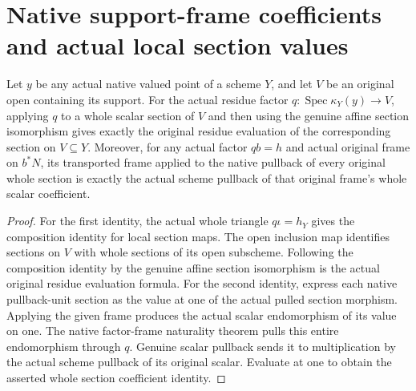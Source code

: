 \section{Native support-frame coefficients and actual local section values}

\begin{lemma}\label{lem:fc-support-factor-scalar-residue}
\leanok
{}
Let $y$ be any actual native valued point of a scheme $Y$, and
let $V$ be an original open containing its support. For the actual
residue factor $q:\operatorname{Spec}\kappa_Y(y)\to V$, applying
$q$ to a whole scalar section of $V$ and then using the genuine
affine section isomorphism gives exactly the original residue
evaluation of the corresponding section on $V\subseteq Y$.
Moreover, for any actual factor $q b=h$ and actual original frame
on $b^*N$, its transported frame applied to the native pullback
of every original whole section is exactly the actual scheme
pullback of that original frame's whole scalar coefficient.
\end{lemma}
\begin{proof}
For the first identity, the actual whole triangle $q\iota=h_Y$
gives the composition identity for local section maps. The open
inclusion map identifies sections on $V$ with whole sections of
its open subscheme. Following the composition identity by the
genuine affine section isomorphism is the actual original residue
evaluation formula. For the second identity, express each native
pullback-unit section as the value at one of the actual pulled
section morphism. Applying the given frame produces the actual
scalar endomorphism of its value on one. The native factor-frame
naturality theorem pulls this entire endomorphism through $q$.
Genuine scalar pullback sends it to multiplication by the actual
scheme pullback of its original scalar. Evaluate at one to obtain
the asserted whole section coefficient identity.
\end{proof}

